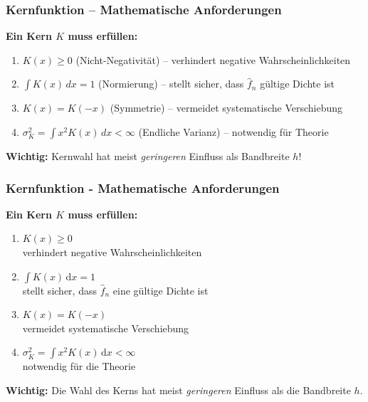\documentclass{beamer}
\begin{document}
	\begin{frame}
		\frametitle{Kernfunktion – Mathematische Anforderungen}
		
		\textbf{Ein Kern $K$ muss erfüllen:}
		\begin{enumerate}
			\item $K(x) \ge 0$ (Nicht-Negativität) – verhindert negative Wahrscheinlichkeiten
			\item $\int K(x)\,dx = 1$ (Normierung) – stellt sicher, dass $\hat{f}_n$ gültige Dichte ist
			\item $K(x) = K(-x)$ (Symmetrie) – vermeidet systematische Verschiebung
			\item $\sigma_K^2 = \int x^2 K(x)\,dx < \infty$ (Endliche Varianz) – notwendig für Theorie
		\end{enumerate}
		
		\vspace{0.5em}
		
		\textbf{Wichtig:} Kernwahl hat meist \textit{geringeren} Einfluss als Bandbreite $h$!
	\end{frame}
	\begin{frame}
		\frametitle{Kernfunktion - Mathematische Anforderungen}
		
		\textbf{Ein Kern $K$ muss erfüllen:}
		
		\begin{enumerate}
			\item $K(x) \ge 0$ \\
			verhindert negative Wahrscheinlichkeiten
			
			\item $\int K(x)\, \mathrm{d}x = 1$ \\
			stellt sicher, dass $\hat{f}_n$ eine gültige Dichte ist
			
			\item $K(x) = K(-x)$ \\
			vermeidet systematische Verschiebung
			
			\item $\sigma_K^2 = \int x^2 K(x)\, \mathrm{d}x < \infty$ \\
			notwendig für die Theorie
		\end{enumerate}
		
		\vspace{0.5em}
		
		\textbf{Wichtig:} Die Wahl des Kerns hat meist \textit{geringeren} Einfluss als die Bandbreite $h$.
		
	\end{frame}
	
\end{document}
